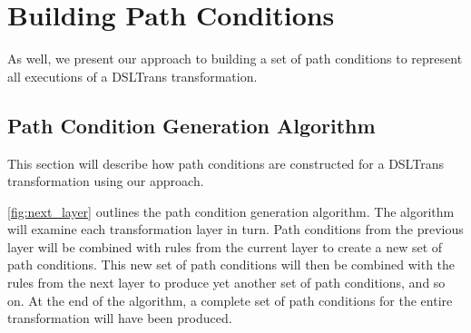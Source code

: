 \section{Building Path Conditions}
\label{sec:building_pcs}

As well, we present our approach to building a set of path conditions to represent all executions of a DSLTrans transformation.



\subsection{Path Condition Generation Algorithm}
\label{sec:gen_all_pcs}

 This section will describe how path conditions are constructed for a DSLTrans transformation using our approach.

\cref{fig:next_layer} outlines the path condition generation algorithm. The algorithm will examine each transformation layer in turn. Path conditions from the previous layer will be combined with rules from the current layer to create a new set of path conditions. This new set of path conditions will then be combined with the rules from the next layer to produce yet another set of path conditions, and so on. At the end of the algorithm, a complete set of path conditions for the entire transformation will have been produced. 

